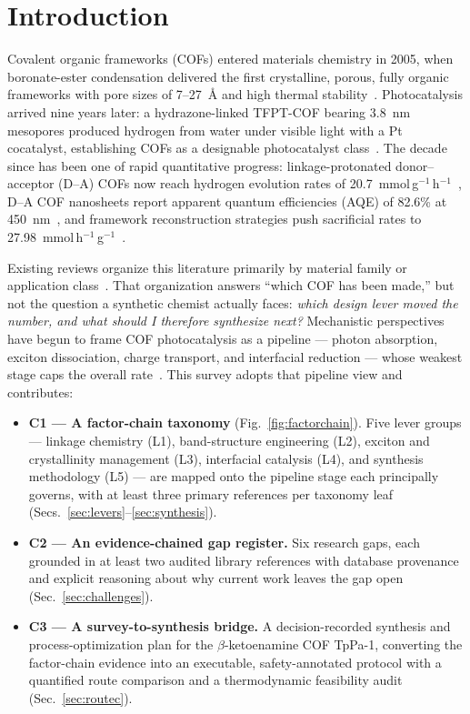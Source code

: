 \section{Introduction}
\label{sec:intro}

Covalent organic frameworks (COFs) entered materials chemistry in 2005, when boronate-ester
condensation delivered the first crystalline, porous, fully organic frameworks with pore sizes
of 7--27~\AA{} and high thermal stability~\cite{cote2005porous}. Photocatalysis arrived nine
years later: a hydrazone-linked TFPT-COF bearing 3.8~nm mesopores produced hydrogen from water
under visible light with a Pt cocatalyst, establishing COFs as a designable photocatalyst
class~\cite{stegbauer2014a}. The decade since has been
one of rapid quantitative progress: linkage-protonated donor--acceptor (D--A) COFs now reach
hydrogen evolution rates of 20.7~mmol\,g$^{-1}$\,h$^{-1}$~\cite{yang2021protonated}, D--A COF
nanosheets report apparent quantum efficiencies (AQE) of 82.6\% at
450~nm~\cite{li2022covalent}, and framework reconstruction strategies push sacrificial rates to
27.98~mmol\,h$^{-1}$\,g$^{-1}$~\cite{zhang2022reconstructed}.

Existing reviews organize this literature primarily by material family or application
class~\cite{wang2020covalent,chen2024photocatalysis}. That organization answers ``which COF has
been made,'' but not the question a synthetic chemist actually faces: \emph{which design lever
moved the number, and what should I therefore synthesize next?} Mechanistic perspectives have
begun to frame COF photocatalysis as a pipeline --- photon absorption, exciton dissociation,
charge transport, and interfacial reduction --- whose weakest stage caps the overall
rate~\cite{blatte2024photons}. This survey adopts that pipeline view and contributes:

\begin{itemize}
\item \textbf{C1 --- A factor-chain taxonomy} (Fig.~\ref{fig:factorchain}). Five lever groups
  --- linkage chemistry (L1), band-structure engineering (L2), exciton and crystallinity
  management (L3), interfacial catalysis (L4), and synthesis methodology (L5) --- are mapped
  onto the pipeline stage each principally governs, with at least three primary references per
  taxonomy leaf (Secs.~\ref{sec:levers}--\ref{sec:synthesis}).
\item \textbf{C2 --- An evidence-chained gap register.} Six research gaps, each grounded in at
  least two audited library references with database provenance and explicit reasoning about
  why current work leaves the gap open (Sec.~\ref{sec:challenges}).
\item \textbf{C3 --- A survey-to-synthesis bridge.} A decision-recorded synthesis and
  process-optimization plan for the $\beta$-ketoenamine COF TpPa-1, converting the factor-chain
  evidence into an executable, safety-annotated protocol with a quantified route comparison and
  a thermodynamic feasibility audit (Sec.~\ref{sec:routec}).
\end{itemize}

